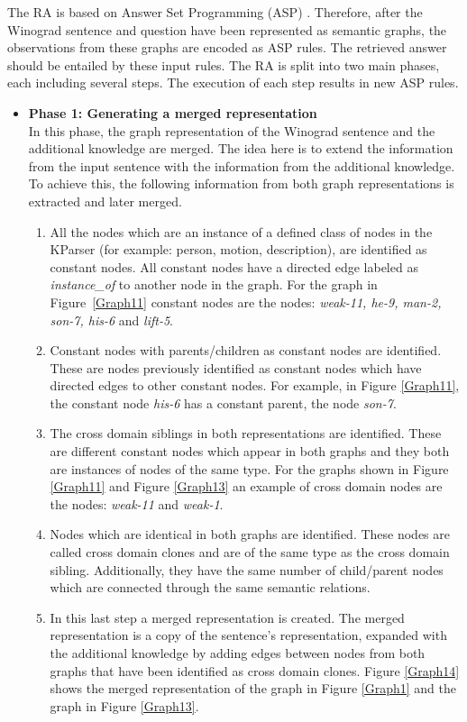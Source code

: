 The RA is based on Answer Set Programming (ASP) \cite{DBLP:conf/aaai/Lifschitz08}. Therefore, after the Winograd sentence and question have been represented as semantic graphs, the observations from these graphs are encoded as ASP rules. The retrieved answer should be entailed by these input rules.
The RA is split into two main phases, each including several steps. The execution of each step results in new ASP rules. 
\begin{itemize}
	\item \textbf{Phase 1: Generating a merged representation}\\
	 In this phase, the graph representation of the Winograd sentence and the additional knowledge are merged. The idea here is to extend the information from the input sentence with the information from the additional knowledge. To achieve this, the following information from both graph representations is extracted and later merged.
	\begin{enumerate}
		\item All the nodes which are an instance of a defined class of nodes in the KParser (for example: person, motion, description), are identified as constant nodes. All constant nodes have a directed edge labeled as \textit{instance\_of} to another node in the graph. For the graph in Figure~\ref{Graph11} constant nodes are the nodes: \textit{weak-11, he-9, man-2, son-7, his-6} and \textit{lift-5}.
		\item Constant nodes with parents/children as constant nodes are identified. These are nodes previously identified as constant nodes which have directed edges to other constant nodes. For example, in Figure \ref{Graph11}, the constant node \textit{his-6} has a constant parent, the node \textit{son-7}.
		\item The cross domain siblings in both representations are identified. These are different constant nodes which appear in both graphs and they both are instances of nodes of the same type. For the graphs shown in Figure \ref{Graph11} and Figure \ref{Graph13} an example of cross domain nodes are the nodes: \textit{weak-11} and \textit{weak-1}. 
		\item Nodes which are identical in both graphs are identified. These nodes are called cross domain clones and are of the same type as the cross domain sibling. Additionally, they have the same number of child/parent nodes which are connected through the same semantic relations. 
		\item In this last step a merged representation is created. The merged representation is a copy of the sentence's representation, expanded with the additional knowledge by adding edges between nodes from both graphs that have been identified as cross domain clones. Figure \ref{Graph14} shows the merged representation of the graph in Figure \ref{Graph1} and the graph in Figure \ref{Graph13}.
	\end{enumerate}


\end{itemize}

